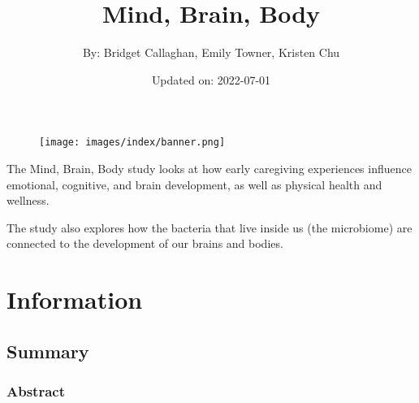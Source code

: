 \documentclass[
]{book}
\title{Mind, Brain, Body}
\author{By: Bridget Callaghan, Emily Towner, Kristen Chu}
\date{Updated on: 2022-07-01}
\begin{document}
\maketitle

{
\setcounter{tocdepth}{1}
\tableofcontents
}
\hypertarget{section}{%
\chapter{}\label{section}}

\begin{figure}
\centering
\texttt{[image: images/index/banner.png]}
\caption{}
\end{figure}

The Mind, Brain, Body study looks at how early caregiving experiences influence emotional, cognitive, and brain development, as well as physical health and wellness.

The study also explores how the bacteria that live inside us (the microbiome) are connected to the development of our brains and bodies.

\hypertarget{information}{%
\chapter{Information}\label{information}}

\hypertarget{summary}{%
\section{Summary}\label{summary}}

\hypertarget{abstract}{%
\subsection{Abstract}\label{abstract}}
\end{document}
